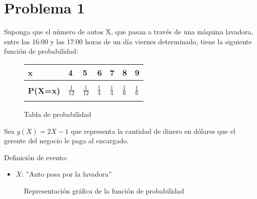 \documentclass{templateNote}
\begin{document}
\portada
\margenes %

\section{Problema 1}
\indent
Suponga que el número de autos X, que pasan a través de una máquina lavadora, entre las 16:00 y las 17:00
horas de un día viernes determinado, tiene la siguiente función de probabilidad:

\begin{figure}[H]
    \begin{center}
        \begin{tabularx}{\textwidth}{|L|L|L|L|L|L|L|}
            \hline
            \textbf{x} & 4 & 5 & 6 & 7 & 8 & 9 \\
            \hline
            & & & & & & \\
            \textbf{P(X=x)} & $\displaystyle\frac{1}{12}$ & $\displaystyle\frac{1}{12}$ & $\displaystyle\frac{1}{4}$ & $\displaystyle\frac{1}{4}$ & $\displaystyle\frac{1}{6}$ & $\displaystyle\frac{1}{6}$ \\
            & & & & & & \\
            \hline
        \end{tabularx}
        \caption{Tabla de probabilidad}
    \end{center}
\end{figure}

Sea $g(X) = 2X - 1$ que representa la cantidad de dinero en dólares que el gerente del negocio le paga al
encargado.

Definición de evento:
\begin{itemize}
    \item $X$: ''Auto pasa por la lavadora''
\end{itemize}

\begin{figure}[H]
    \begin{center}
        \caption{Representación gráfica de la función de probabilidad}
    \end{center}
\end{figure}
\end{document}
